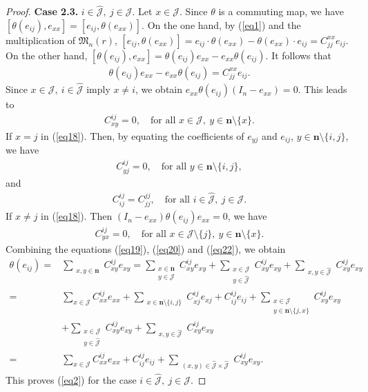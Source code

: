 \documentclass[reqno]{amsart}
\theoremstyle{plain}
\theoremstyle{definition}
\begin{document}
\begin{proof}
\textbf{Case 2.3.} $i \in \hat{\mathcal{J}},~j \in \mathcal{J}$. Let $x \in \mathcal{J}$. Since $\theta$ is a commuting map, we have $[\theta(e_{ij}), e_{xx}] = [e_{ij}, \theta(e_{xx})]$.
On the one hand, by (\ref{eq1}) and the multiplication of $\mathfrak{M}_n(r)$, $[e_{ij}, \theta(e_{xx})] = e_{ij} \cdot  \theta(e_{xx}) - \theta(e_{xx}) \cdot  e_{ij} = C_{jj}^{xx} e_{ij}$.
On the other hand, $[\theta(e_{ij}), e_{xx}] = \theta(e_{ij}) e_{xx} - e_{xx} \theta(e_{ij})$. It follows that
 \begin{align}\label{eq18}
\theta(e_{ij}) e_{xx} - e_{xx} \theta(e_{ij}) = C_{jj}^{xx} e_{ij}.
 \end{align}
Since $x \in \mathcal{J},~i \in \hat{\mathcal{J}}$ imply $x \neq i$, we obtain $e_{xx} \theta(e_{ij}) (I_n - e_{xx}) = 0$. This leads to
 \begin{align}\label{eq19}
C_{xy}^{ij} = 0, \quad \text{for all } x \in \mathcal{J}, ~y \in \mathbf{n} \setminus \{x\}.  
\end{align}
If $x = j$ in (\ref{eq18}). Then, by equating the coefficients of $e_{yj}$ and $e_{ij}$, $y \in \mathbf{n} \setminus \{i, j\}$, we have
 \begin{align}\label{eq20}
C_{yj}^{ij} = 0, \quad \text{for all } y \in \mathbf{n} \setminus \{i, j\},
 \end{align}
and
 \begin{align}\label{eq21}
C_{ij}^{ij} = C_{jj}^{jj}, \quad \text{for all } i \in \hat{\mathcal{J}}, ~j \in \mathcal{J}. 
 \end{align}
If $x \neq j$ in (\ref{eq18}). Then $(I_n - e_{xx}) \theta(e_{ij}) e_{xx} = 0$, we have
 \begin{align}\label{eq22}
C_{yx}^{ij} = 0, \quad \text{for all } x \in \mathcal{J} \setminus \{j\},~ y \in \mathbf{n} \setminus \{x\} .
\end{align}
Combining the equations (\ref{eq19}), (\ref{eq20}) and (\ref{eq22}), we obtain
\[
\begin{aligned}
\theta(e_{ij})
=& \sum_{\substack{x,y \in \mathbf{n}}} C_{xy}^{ij} e_{xy}
= \sum_{\substack{x \in \mathbf{n} \\ y \in \mathcal{J}}} C_{xy}^{ij} e_{xy}+ \sum_{\substack{x \in \mathcal{J} \\ y \in \hat{\mathcal{J}}}} C_{xy}^{ij} e_{xy} +\sum_{\substack{x,y \in \hat{\mathcal{J}}}} C_{xy}^{ij} e_{xy}\\
=&\sum_{x \in \mathcal{J}} C_{xx}^{ij} e_{xx} + \sum_{\substack{x \in \mathbf{n}\setminus \{i,j\} }} C_{xj}^{ij} e_{xj}+C_{ij}^{ij} e_{ij}+\sum_{\substack{x \in \mathcal{J} \\y \in \mathbf{n}\setminus \{j, x\} }} C_{xy}^{ij} e_{xy} \\
&+\sum_{\substack{x \in \mathcal{J}\\y \in \hat{\mathcal{J}} }} C_{xy}^{ij} e_{xy}+ \sum_{\substack{x,y \in \hat{\mathcal{J}}}} C_{xy}^{ij} e_{xy}  \\
=& \sum_{x \in \mathcal{J}} C_{xx}^{ij} e_{xx} + C_{ij}^{ij} e_{ij} + 
 \sum_{\substack{(x,y) \in \hat{\mathcal{J}}\times \hat{\mathcal{J}}}} C_{xy}^{ij} e_{xy}.
\end{aligned}
\]
This proves (\ref{eq2}) for the case $i \in \hat{\mathcal{J}}, ~j \in \mathcal{J}$.


\end{proof}
\end{document}
